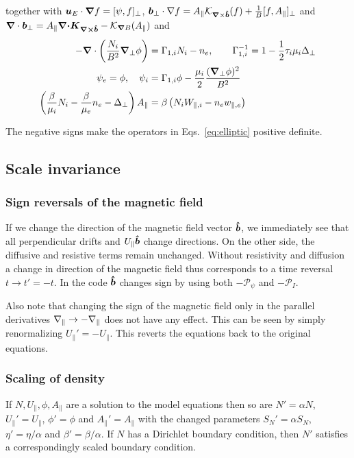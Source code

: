together with
${\boldsymbol{u}}_E\cdot{\boldsymbol{\nabla}} f = [ \psi, f]_\perp$,
${{\boldsymbol{b}}}_\perp\cdot \nabla f = A_\parallel \mathcal K_{{\boldsymbol{\nabla}}\times\bm{\hat{b}}}(f) + \frac{1}{B}[ f, A_\parallel]_\perp$
and ${\boldsymbol{\nabla}}\cdot { {\boldsymbol{b}}}_\perp = A_\parallel {\boldsymbol{{\boldsymbol{\nabla}}\cdot}}{\boldsymbol{ { K}_{{\boldsymbol{\nabla}}\times\bm{\hat{b}}}}} - \mathcal K_{{\boldsymbol{\nabla}} B}(A_\parallel) $
and
\begin{subequations} \label{eq:elliptic}
  \begin{align}
    -{\boldsymbol{\nabla}}\cdot\left( \frac{N_i}{B^2}{\boldsymbol{\nabla}}_{\perp} \phi \right) &= \Gamma_{1,i} N_i - n_e, \quad\quad
    \Gamma_{1,i}^{-1} = 1-\frac{1}{2}\tau_i\mu_i \Delta_\perp \\
    \psi_e = \phi, \quad \psi_i &= \Gamma_{1,i}\phi -\frac{\mu_i}{2}\frac{({\boldsymbol{\nabla}}_{\perp}\phi)^2}{B^2} \\
    \left(\frac{\beta}{\mu_i}N_i - \frac{\beta}{\mu_e}n_e-\Delta_\perp\right)
    A_\parallel &= \beta\left(N_iW_{\parallel,i}-n_e w_{\parallel,e}\right)
  \end{align}
\end{subequations}
\begin{tcolorbox}[title=Note]
The negative signs make the operators in Eqs.~\eqref{eq:elliptic} positive definite.
\end{tcolorbox}

\subsection{Scale invariance}
\subsubsection{Sign reversals of the magnetic field}\label{sec:field_reversal}
If we change the direction of the magnetic field vector $\bm{\hat{b}}$, we immediately see that all perpendicular
drifts and $U_\parallel\bm{\hat{b}}$ change directions. On the other side, the diffusive and resistive terms remain unchanged.
Without resistivity and diffusion a change in direction of the magnetic field thus corresponds to
a time reversal $t\rightarrow t'=-t$.
In the code $\bm{\hat{b}}$ changes sign by using both $-\mathcal P_\psi$ and $-\mathcal P_I$.

Also note that changing the sign of the magnetic field only in the parallel derivatives $\nabla_\parallel \rightarrow -\nabla_\parallel$ does not
have any effect. This can be seen by simply renormalizing $U_\parallel'=-U_\parallel$. This reverts the equations back to the original equations.
\subsubsection{Scaling of density}
If $N, U_\parallel, \phi, A_\parallel$ are a solution to the model equations
then so are $N'=\alpha N$, $U_\parallel'=U_\parallel$, $\phi'=\phi$ and $A_\parallel'=A_\parallel$ with the changed parameters $S_N' = \alpha S_N$, $\eta' = \eta/\alpha$ and $ \beta' = \beta/\alpha$. If $N$
has a Dirichlet boundary condition, then $N'$ satisfies a correspondingly scaled boundary condition.
